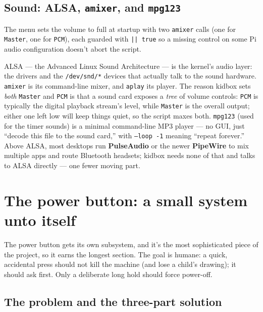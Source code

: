 \documentclass[11pt,oneside]{article}
\newcommand{\code}[1]{\texorpdfstring{\textcolor{kbblue}{\texttt{#1}}}{#1}}
\begin{document}
\subsection{Sound: ALSA, \texttt{amixer}, and \texttt{mpg123}}

The menu sets the volume to full at startup with two \texttt{amixer} calls (one
for \code{Master}, one for \code{PCM}), each guarded with \code{|| true} so a
missing control on some Pi audio configuration doesn't abort the script.

\begin{deeper}
ALSA --- the Advanced Linux Sound Architecture --- is the kernel's audio layer:
the drivers and the \code{/dev/snd/*} devices that actually talk to the sound
hardware. \texttt{amixer} is its command-line mixer, and \texttt{aplay} its
player. The reason kidbox sets \emph{both} \code{Master} and \code{PCM} is that a
sound card exposes a \emph{tree} of volume controls: \code{PCM} is typically the
digital playback stream's level, while \code{Master} is the overall output;
either one left low will keep things quiet, so the script maxes both.
\texttt{mpg123} (used for the timer sounds) is a minimal command-line MP3 player
--- no GUI, just ``decode this file to the sound card,'' with \code{--loop -1}
meaning ``repeat forever.'' Above ALSA, most desktops run \textbf{PulseAudio} or
the newer \textbf{PipeWire} to mix multiple apps and route Bluetooth headsets;
kidbox needs none of that and talks to ALSA directly --- one fewer moving part.
\end{deeper}

\section{The power button: a small system unto itself}

The power button gets its own subsystem, and it's the most sophisticated piece
of the project, so it earns the longest section. The goal is humane: a quick,
accidental press should not kill the machine (and lose a child's drawing); it
should ask first. Only a deliberate long hold should force power-off.

\subsection{The problem and the three-part solution}
\end{document}
